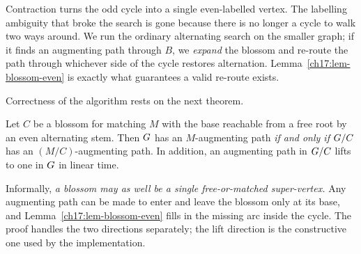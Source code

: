 \begin{focusbox}
Contraction turns the odd cycle into a single even-labelled vertex. The labelling ambiguity that
broke the search is gone because there is no longer a cycle to walk two ways around. We run the
ordinary alternating search on the smaller graph; if it finds an augmenting path through $B$, we
\emph{expand} the blossom and re-route the path through whichever side of the cycle restores
alternation. Lemma~\ref{ch17:lem-blossom-even} is exactly what guarantees a valid re-route exists.
\end{focusbox}

Correctness of the algorithm rests on the next theorem.

\begin{theorem}
\label{ch17:thm-contract}
Let $C$ be a blossom for matching $M$ with the base reachable from a free root by an even alternating
stem. Then $G$ has an $M$-augmenting path \emph{if and only if} $G/C$ has an
$(M/C)$-augmenting path. In addition, an augmenting path in $G/C$ lifts to one in $G$ in linear
time.
\end{theorem}

\begin{whybox}
Informally, \emph{a blossom may as well be a single free-or-matched super-vertex.} Any augmenting
path can be made to enter and leave the blossom only at its base, and Lemma~\ref{ch17:lem-blossom-even}
fills in the missing arc inside the cycle. The proof handles the two directions separately; the lift
direction is the constructive one used by the implementation.
\end{whybox}

